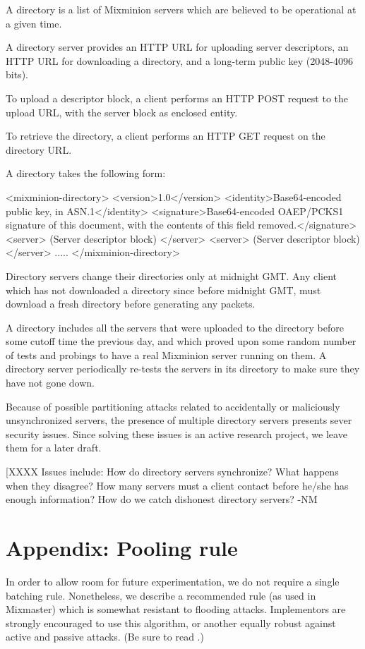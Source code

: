 A directory is a list of Mixminion servers which are believed to
be operational at a given time.

A directory server provides an HTTP URL for uploading server
descriptors, an HTTP URL for downloading a directory, and a long-term
public key (2048-4096 bits).

To upload a descriptor block, a client performs an HTTP POST request
to the upload URL, with the server block as enclosed entity.

To retrieve the directory, a client performs an HTTP GET request on
the directory URL.

A directory takes the following form:

<mixminion-directory>
  <version>1.0</version>
  <identity>Base64-encoded public key, in ASN.1</identity>
  <signature>Base64-encoded OAEP/PCKS1 signature of this document, with
     the contents of this field removed.</signature>
  <server>
     (Server descriptor block)
  </server>
  <server>
     (Server descriptor block)
  </server>
   .....
</mixminion-directory>

Directory servers change their directories only at midnight GMT.  Any
client which has not downloaded a directory since before midnight GMT,
must download a fresh directory before generating any packets.

A directory includes all the servers that were uploaded to the
directory before some cutoff time the previous day, and which proved
upon some random number of tests and probings to have a real Mixminion
server running on them.  A directory server periodically re-tests
the servers in its directory to make sure they have not gone down.

Because of possible partitioning attacks related to accidentally or
maliciously unsynchronized servers, the presence of multiple directory
servers presents sever security issues.  Since solving these issues is
an active research project, we leave them for a later draft.

[XXXX Issues include:  How do directory servers synchronize?
   What happens when they disagree?  How many servers must a client
   contact before he/she has enough information?  How do we catch
   dishonest directory servers? -NM

\section{Appendix: Pooling rule}

In order to allow room for future experimentation, we do not require a
single batching rule.  Nonetheless, we describe a recommended rule (as
used in Mixmaster) which is somewhat resistant to flooding attacks.
Implementors are strongly encouraged to use this algorithm, or another
equally robust against active and passive attacks.  (Be sure to read
\cite{batching-taxonomy}.)

